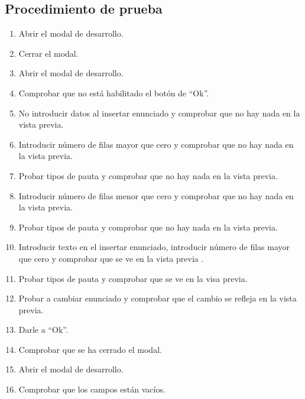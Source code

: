 \subsection{Procedimiento de prueba}
\label{procedimientoPruebas:desarrollo}
\begin{enumerate}
    \item Abrir el modal de desarrollo.
    \item Cerrar el modal.
    \item Abrir el modal de desarrollo.
    \item Comprobar que no está habilitado el botón de ``Ok''.
    \item No introducir datos al insertar enunciado y comprobar que no hay nada en la vista previa.
    \item Introducir número de filas mayor que cero y comprobar que no hay nada en la vista previa.
    \item Probar tipos de pauta y comprobar que no hay nada en la vista previa.
    \item Introducir número de filas menor que cero y comprobar que no hay nada en la vista previa.
    \item Probar tipos de pauta y comprobar que no hay nada en la vista previa.
    \item Introducir texto en el insertar enunciado, introducir número de filas mayor que cero y comprobar que se ve en la vista previa .
    \item Probar tipos de pauta y comprobar que se ve en la visa previa.
    \item Probar a cambiar enunciado y comprobar que el cambio se refleja en la vista previa.
    \item Darle a ``Ok''.
    \item Comprobar que se ha cerrado el modal.
    \item Abrir el modal de desarrollo.
    \item Comprobar que los campos están vacíos.
\end{enumerate}

